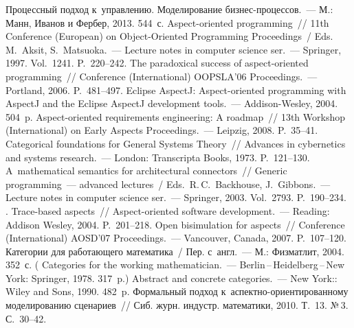 \begin{multicols}{2}
{\small\frenchspacing
 {%
 \begin{thebibliography}{99}
 Процессный подход к~управ\-ле\-нию. Моделирование
биз\-нес-про\-цес\-сов.~--- М.: Манн, Иванов и Фербер, 2013. 544~с.
Aspect-oriented programming~// 11th Conference (European) on Object-Oriented
Programming Proceedings~/ Eds. M.~Aksit, S.~Matsuoka.~---
Lecture notes in computer science ser.~---
Springer, 1997. Vol.~1241. P.~220--242.
 The paradoxical success of aspect-oriented programming~// Conference
(International) OOPSLA'06 Proceedings.~--- Portland, 2006. P.~481--497.
 Eclipse AspectJ: Aspect-oriented
programming with AspectJ and the Eclipse AspectJ development tools.~---
Addison-Wesley, 2004. 504~p.
 Aspect-oriented requirements engineering: A roadmap~// 13th
Workshop (International) on Early Aspects Proceedings.~--- Leipzig, 2008. P.~35--41.
 Categorical foundations for General Systems Theory~// Advances in cybernetics
and systems research.~--- London: Transcripta Books, 1973. P.~121--130.
 A~mathematical semantics for architectural
connectors~// Generic programming~--- advanced lectures~/
Eds.\ R.\,C.~Backhouse, J.~Gibbons.~--- Lecture notes in computer science ser.~---
Springer, 2003. Vol.~2793. P.~190--234.
. Trace-based aspects~// Aspect-oriented
software development.~--- Reading: Addison Wesley, 2004. P.~201--218.
 Open bisimulation for aspects~// Conference
(International) AOSD'07 Proceedings.~--- Vancouver, Canada, 2007. P.~107--120.
 Категории для работающего математика~/ Пер. с~англ.~---
М.: Физматлит, 2004. 352~с.
( {Categories for the working mathematician}.~---
Berlin\,--\,Heidelberg\,--\,New York: Springer, 1978. 317~p.)
 Abstract and concrete categories.~---
New York:: Wiley and Sons, 1990. 482~p.
 Формальный подход к~ас\-пект\-но-ори\-ен\-ти\-ро\-ван\-но\-му
моделированию сценариев~// Сиб. журн. индустр. математики, 2010. Т.~13. №\,3. С.~30--42.

\end{thebibliography}}}
\end{multicols}
